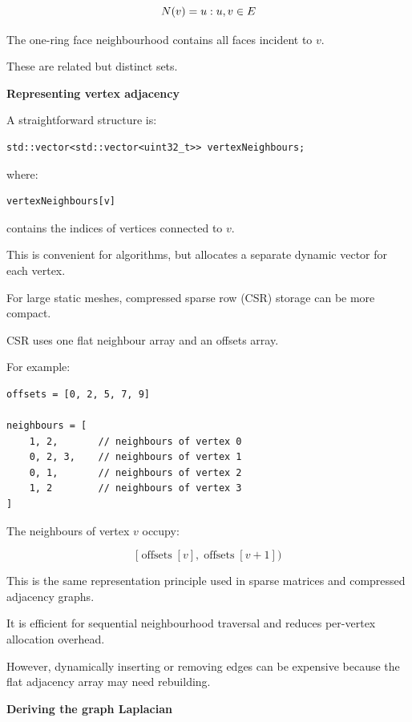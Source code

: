 \[
N(v)=\\{u:\\{u,v\\}\in E\\}
\]

The one-ring face neighbourhood contains all faces incident to \(v\).

These are related but distinct sets.

\textbf{Representing vertex adjacency}

A straightforward structure is:

\begin{verbatim}
std::vector<std::vector<uint32_t>> vertexNeighbours;
\end{verbatim}

where:

\begin{verbatim}
vertexNeighbours[v]
\end{verbatim}

contains the indices of vertices connected to \(v\).

This is convenient for algorithms, but allocates a separate dynamic vector for each vertex.

For large static meshes, compressed sparse row (CSR) storage can be more compact.

CSR uses one flat neighbour array and an offsets array.

For example:

\begin{verbatim}
offsets = [0, 2, 5, 7, 9]

neighbours = [
    1, 2,       // neighbours of vertex 0
    0, 2, 3,    // neighbours of vertex 1
    0, 1,       // neighbours of vertex 2
    1, 2        // neighbours of vertex 3
]
\end{verbatim}

The neighbours of vertex \(v\) occupy:

\[
[\operatorname{offsets}[v], \operatorname{offsets}[v+1])
\]

This is the same representation principle used in sparse matrices and compressed adjacency graphs.

It is efficient for sequential neighbourhood traversal and reduces per-vertex allocation overhead.

However, dynamically inserting or removing edges can be expensive because the flat adjacency array may need rebuilding.

\textbf{Deriving the graph Laplacian}

